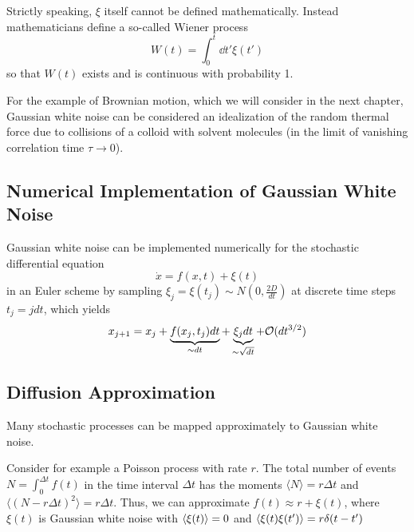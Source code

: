 \documentclass{notebook}
\begin{document}
\begin{caveat}
	Strictly speaking, $\xi$ itself cannot be defined mathematically. Instead mathematicians define a so-called Wiener process 
	\begin{equation}
	W(t) = \int_0^t{\dd{t'} \xi(t')}
	\end{equation}
	so that $W(t)$ exists and is continuous with probability 1.
\end{caveat}

For the example of Brownian motion, which we will consider in the next chapter, Gaussian white noise can be considered an idealization of the random thermal force due to collisions of a colloid with solvent molecules (in the limit of vanishing correlation time $\tau \to 0$). 


\subsection*{Numerical Implementation of Gaussian White Noise}

Gaussian white noise can be implemented numerically for the stochastic differential equation
%
\begin{equation}
	\dot{x} = f(x,t) + \xi(t)
\end{equation}
%
in an Euler scheme by sampling $\xi_j = \xi(t_j) \sim N(0, \frac{2D}{dt})$ at discrete time steps $t_j = j dt$, which yields 
%
\begin{equation}
	x_{j+1} = x_j + \underbrace{f(x_j, t_j) dt}_{\sim dt} + \underbrace{\xi_j dt}_{\sim \sqrt{dt}} + \mathcal{O}(dt^{3/2})
\end{equation}
%

\subsection*{Diffusion Approximation}

Many stochastic processes can be mapped approximately to Gaussian white noise. 

Consider for example a Poisson process with rate $r$. The total number of events $N = \int_0^{\Delta t} f(t)$ in the time interval $\Delta t$ has the moments $\langle N \rangle = r \Delta t$ and $\langle (N - r \Delta t)^2 \rangle = r \Delta t$. Thus, we can approximate $f(t) \approx r + \xi(t)$, where $\xi(t)$ is Gaussian white noise with $\expval{\xi(t)} = 0$ and $\expval{\xi(t) \xi(t')} = r \delta(t-t^\prime)$
\end{document}
